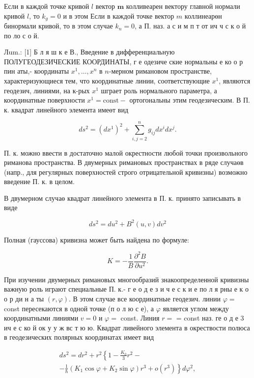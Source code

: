 \documentclass[10pt]{article}
\begin{document}
Если в каждой точке кривой $l$ вектор $\boldsymbol{m}$ колливеарен вектору главной нормали кривой $l$, то $k_{g}=0$ и в этом Если в каждой точке вектор $m$ коллинеарөн бинормали кривой, то в этом случае $k_{n}=0$, а П. наз. а с и м п т от ич ч с к о й по ло с о й.



Лum.: [1] Б л я ш к е В., Введение в дифференциальную ПОЛУГЕОДЕЗИЧЕСКИЕ КООРДИНАТЫ, $г$ е одезиче ские нормальны е ко о р пин аты,- координаты $x^{1}, \ldots, x^{n}$ в $n$-мерном римановом пространстве, характеризующиеся тем, что координатные линии, соответствующие $x^{1}$, являются геодезич, линиями, на к-рых $x^{1}$ шграет роль нормального параметра, а координатные поверхности $x^{\mathrm{1}}=\mathrm{const}-$ ортогональны этим геодезическим. В П. к. квадрат линейного элемента имеөт вид



\[

d s^{2}=\left(d x^{1}\right)^{2}+\sum_{i, j=2}^{n} g_{i j} d x^{i} d x^{j} .

\]



П. к. можно ввести в достаточно малой окрестности любой точки произвольного риманова пространства. В двумерных римановых пространствах в ряде случаөв (напр., для регулярных поверхностей строго отрицательной кривизны) возможно введение П. к. в целом.



В двумерном случаө квадрат линейного элемента в П. к. принято записывать в виде



\[

d s^{2}=d u^{2}+B^{2}(u, v) d v^{2}

\]



Полная (гауссова) кривизна может быть найдена по формуле:



\[

K=-\frac{1}{B} \frac{\partial^{2} B}{\partial u^{2}} .

\]



При изучении двумерных римановых многообразий знакоопределенной кривизны важную роль играют специальные П. к.- г е о д е з и ч е с к и е по л я рны е к о о р ди н а ты $(r, \varphi)$. В этом случае все координатные геодезич. линии $\varphi=$ const пересекаются в одной точке (п о л ю с е), а $\varphi$ является углом между координатными линиями $v=0$ и $\varphi=$ const. Линия $r=$ = const наз. ге о д е 3 ич е с ко й ок у у ж вс т ю ю. Квадрат ливейного элемента в окрествости полюса в геодезических полярных координатах имеет вид



\[

\begin{gathered}

d s^{2}=d r^{2}+r^{2}\left\{1-\frac{K_{0}}{3} r^{2}-\right. \\

\left.-\frac{1}{\hbar}\left(K_{1} \cos \varphi+K_{2} \sin \varphi\right) r^{3}+o\left(r^{3}\right)\right\} d \varphi^{2},

\end{gathered}

\]
\end{document}

